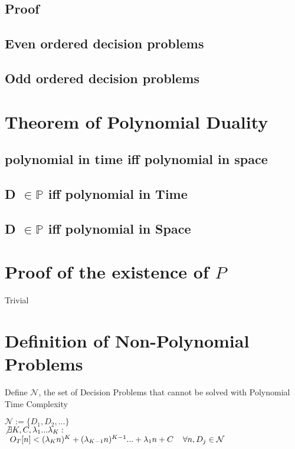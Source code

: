 \documentclass[11pt]{article}
\begin{document}
\subsection{Proof}

\subsection{Even ordered decision problems}
\subsection{Odd ordered decision problems}


\section{Theorem of Polynomial Duality}
\subsection{polynomial in time iff polynomial in space}
\subsection{D $\in \mathbb{P}$ iff polynomial in Time}
\subsection{D $\in \mathbb{P}$ iff polynomial in Space}



\section{Proof of the existence of $P$}
Trivial





\section{Definition of Non-Polynomial Problems}
Define $\mathcal{N}$, the set of Decision Problems that cannot be solved with Polynomial Time Complexity
\begin{center}
$
\mathcal{N} := \{ D_1,D_2,...\} 
$
\\
$ 
\not \exists K,C,\lambda_1...\lambda_K : \hspace{2mm}
$
\\
$
\hspace{2mm} O_T[n] < (\lambda_K n)^K + (\lambda_{K-1} n)^{K-1}... + \lambda_1 n + C \hspace{4mm} \forall n, D_j \in \mathcal{N}
$
\end{center}
\end{document}

